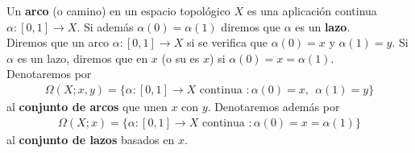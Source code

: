 \begin{definicion}
    Un \textbf{arco} (o camino) en un espacio topológico $X$ es una aplicación continua $\alpha:[0,1]\to X$. Si además $\alpha(0) = \alpha(1)$ diremos que $\alpha$ es un \textbf{lazo}.\\

    \noindent
    Diremos que un arco $\alpha:[0,1]\to X$  si se verifica que $\alpha(0)=x$ y $\alpha(1) = y$. Si $\alpha$ es un lazo, diremos que  en $x$ (o su  es $x$) si $\alpha(0)=x=\alpha(1)$.\\

    \noindent
    Denotaremos por 
    \begin{gather*}
        \Omega(X;x,y) = \{\alpha:[0,1]\to X \text{ continua } : \alpha(0)=x, \ \ \alpha(1)=y\}
    \end{gather*}
    al \textbf{conjunto de arcos} que unen $x$ con $y$. Denotaremos además por  
    \begin{gather*}
        \Omega(X;x) = \{\alpha:[0,1]\to X \text{ continua } : \alpha(0)=x=\alpha(1)\}
    \end{gather*}
    al \textbf{conjunto de lazos} basados en $x$.
\end{definicion}

